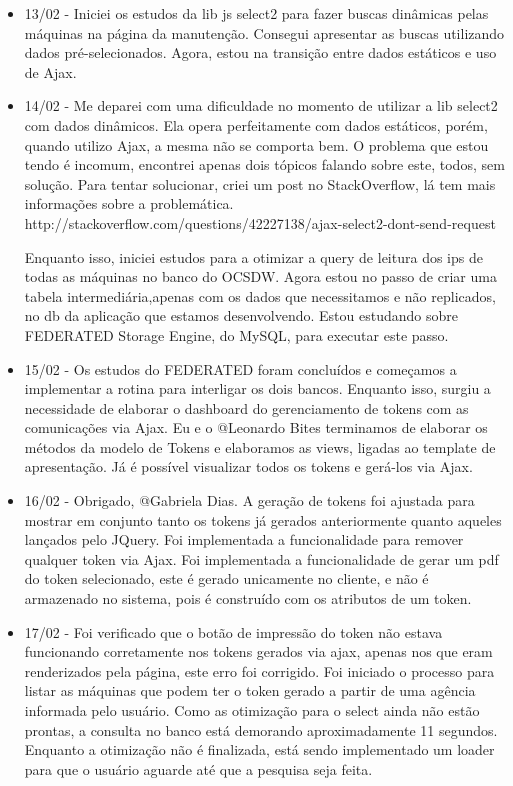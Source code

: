 \begin{itemize}
    \item 13/02 -
  Iniciei os estudos da lib js select2 para fazer buscas dinâmicas pelas máquinas na página da manutenção. Consegui apresentar as buscas utilizando dados pré-selecionados. Agora, estou na transição entre dados estáticos e uso de Ajax.


    \item 14/02 -
  Me deparei com uma dificuldade no momento de utilizar a lib select2 com dados dinâmicos. Ela opera perfeitamente com dados estáticos, porém, quando utilizo Ajax, a mesma não se comporta bem. O problema que estou tendo é incomum, encontrei apenas dois tópicos falando sobre este, todos, sem solução. Para tentar solucionar, criei um post no StackOverflow, lá tem mais informações sobre a problemática. http://stackoverflow.com/questions/42227138/ajax-select2-dont-send-request

  Enquanto isso, iniciei estudos para a otimizar a query de leitura dos ips de todas as máquinas no banco do OCSDW. Agora estou no passo de criar uma tabela intermediária,apenas com os dados que necessitamos e não replicados, no db da aplicação que estamos desenvolvendo. Estou estudando sobre FEDERATED Storage Engine, do MySQL, para executar este passo.


    \item 15/02 -
  Os estudos do FEDERATED foram concluídos e começamos a implementar a rotina para interligar os dois bancos.
  Enquanto isso, surgiu a necessidade de elaborar o dashboard do gerenciamento de tokens com as comunicações via Ajax. Eu e o @Leonardo Bites terminamos de elaborar os métodos da modelo de Tokens e elaboramos as views, ligadas ao template de apresentação. Já é possível visualizar todos os tokens e gerá-los via Ajax.


    \item 16/02 -
  Obrigado, @Gabriela Dias.
  A geração de tokens foi ajustada para mostrar em conjunto tanto os tokens já gerados anteriormente quanto aqueles lançados pelo JQuery.
  Foi implementada a funcionalidade para remover qualquer token via Ajax.
  Foi implementada a funcionalidade de gerar um pdf do token selecionado, este é gerado unicamente no cliente, e não é armazenado no sistema, pois é construído com os atributos de um token.


    \item 17/02 -
  Foi verificado que o botão de impressão do token não estava funcionando corretamente nos tokens gerados via ajax, apenas nos que eram renderizados pela página, este erro foi corrigido.
  Foi iniciado o processo para listar as máquinas que podem ter o token gerado a partir de uma agência informada pelo usuário. Como as otimização para o select ainda não estão prontas, a consulta no banco está demorando aproximadamente 11 segundos. Enquanto a otimização não é finalizada, está sendo implementado um loader para que o usuário aguarde até que a pesquisa seja feita.



\end{itemize}

